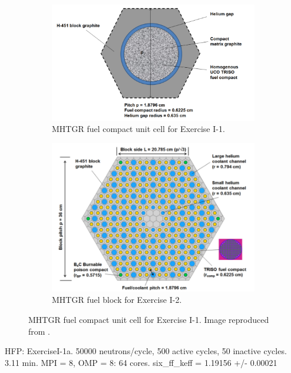 \documentclass[11pt,letterpaper]{article}
\begin{document}
	\begin{figure}[htbp!]
		\centering
		\begin{subfigure}[t]{0.4\textwidth}
			\centering
			\includegraphics[width=\linewidth]{exerciseI-1-geo}
			\caption{MHTGR fuel compact unit cell for Exercise I-1.}
			\label{fig:compact}
		\end{subfigure}
		\begin{subfigure}[t]{0.4\textwidth}
			\centering
			\includegraphics[width=\linewidth]{exerciseI-2-geo}
			\caption{MHTGR fuel block for Exercise I-2.}
			\label{fig:fuelblock}
		\end{subfigure}
		\hfill
		\caption{MHTGR fuel compact unit cell for Exercise I-1. Image reproduced from \cite{strydom_results_2015}.}
		\label{fig:fuel}
	\end{figure}

HFP:
ExerciseI-1a.
50000 neutrons/cycle, 500 active cycles, 50 inactive cycles.
3.11 min. MPI = 8, OMP = 8: 64 cores.
six_ff_keff = 1.19156 +/- 0.00021
\end{document}
